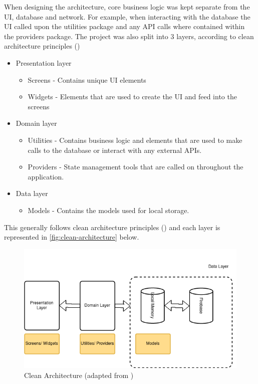 \documentclass[12pt]{article}
\begin{document}
	When designing the architecture, core business logic was kept separate from the UI, database and network. For example, when interacting with the database the UI called upon the utilities package and any API calls where contained within the providers package. The project was also split into 3 layers, according to clean architecture principles (\cite{martinRapidApplicationDevelopment1991})
	
	\begin{itemize}
		\item Presentation layer
		\begin{itemize}
			\item Screens - Contains unique UI elements
			\item Widgets - Elements that are used to create the UI and feed into the screens
		\end{itemize}
	\end{itemize}
	
	\begin{itemize}
		\item Domain layer
		\begin{itemize}
			\item Utilities - Contains business logic and elements that are used to make calls to the database or interact with any external APIs.
			\item Providers - State management tools that are called on throughout the application.
		\end{itemize}
	\end{itemize}
	
	\begin{itemize}
		\item Data layer
		\begin{itemize}
			\item Models - Contains the models used for local storage.
		\end{itemize}
	\end{itemize}

	 This generally follows clean architecture principles (\cite{martinRapidApplicationDevelopment1991}) and each layer is represented in \autoref{fig:clean-architecture} below.
	 
	 \begin{figure}[H]
	 	\centering
	 	\includegraphics[scale=0.7]{images/clean-architecture.png}
	 	\caption{Clean Architecture (adapted from \cite{martinRapidApplicationDevelopment1991})}
	 	\label{fig:clean-architecture}
	 \end{figure}
 
\end{document}
